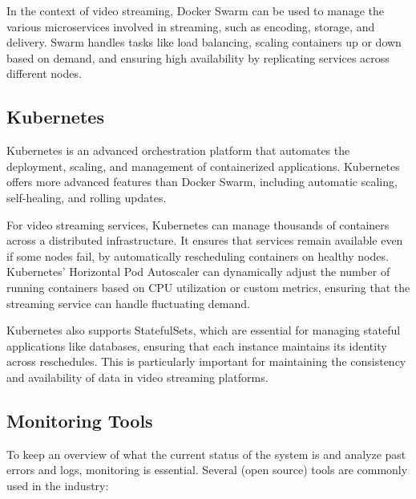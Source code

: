In the context of video streaming, Docker Swarm can be used to manage the various microservices involved in streaming, such as encoding, storage, and delivery. Swarm handles tasks like load balancing, scaling containers up or down based on demand, and ensuring high availability by replicating services across different nodes\cite{docker_swarm_deployment}.

\subsection{Kubernetes}
Kubernetes is an advanced orchestration platform that automates the deployment, scaling, and management of containerized applications. Kubernetes offers more advanced features than Docker Swarm, including automatic scaling, self-healing, and rolling updates.

For video streaming services, Kubernetes can manage thousands of containers across a distributed infrastructure. It ensures that services remain available even if some nodes fail, by automatically rescheduling containers on healthy nodes. Kubernetes' Horizontal Pod Autoscaler can dynamically adjust the number of running containers based on CPU utilization or custom metrics, ensuring that the streaming service can handle fluctuating demand\cite{kubernetes_video_deployment}.

Kubernetes also supports StatefulSets, which are essential for managing stateful applications like databases, ensuring that each instance maintains its identity across reschedules. This is particularly important for maintaining the consistency and availability of data in video streaming platforms\cite{statefulset_kubernetes}.

\subsection{Monitoring Tools}
To keep an overview of what the current status of the system is and analyze past errors and logs, monitoring is essential. Several (open source) tools are commonly used in the industry:

